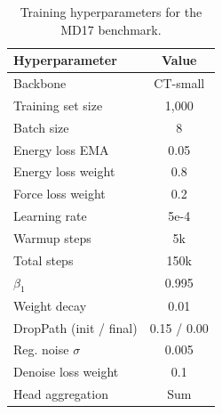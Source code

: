 \begin{table}[t]
\centering
\caption{Training hyperparameters for the MD17 benchmark.}
\label{tab:md17_hparams}
\begin{tabular}{lc}
\toprule
\textbf{Hyperparameter} & \textbf{Value} \\
\midrule
Backbone                  & CT-small \\
Training set size         & 1{,}000 \\
Batch size                & 8 \\
Energy loss EMA           & 0.05 \\
Energy loss weight        & 0.8 \\
Force loss weight         & 0.2 \\
Learning rate             & 5e{-4} \\
Warmup steps              & 5k \\
Total steps               & 150k \\
$\beta_1$                 & 0.995 \\
Weight decay              & 0.01 \\
DropPath (init / final)   & 0.15 / 0.00 \\
Reg. noise $\sigma$       & 0.005 \\
Denoise loss weight       & 0.1 \\
Head aggregation          & Sum \\
\bottomrule
\end{tabular}
\end{table}

